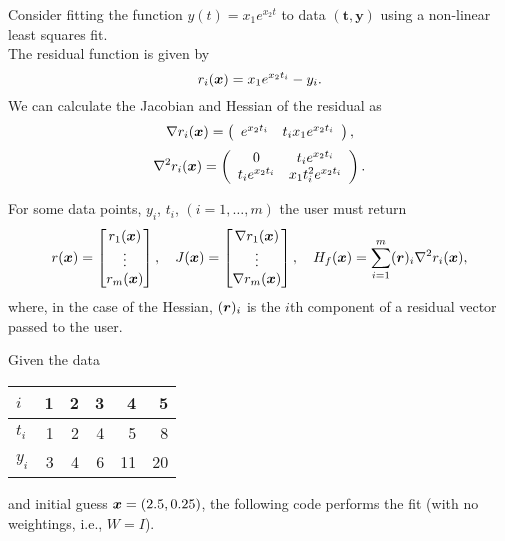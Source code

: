 
Consider fitting the function $y(t) = x_1e^{x_2 t}$ to data $(\bm{t}, \bm{y})$
using a non-linear least squares fit.\\
The residual function is given by
$$
   r_i({\bm x})  = x_1 e^{x_2 t_i} - y_i.
$$
We can calculate the Jacobian and Hessian of the residual as
$$
   \nabla r_i({\bm x}) = \left(\begin{array}{cc}
      e^{x_2 t_i} &
      t_i x_1 e^{x_2 t_i}
      \end{array}\right),
$$
$$
   \nabla^2 r_i({\bm x}) = \left(\begin{array}{cc}
      0                 & t_i e^{x_2 t_i}    \\
      t_i e^{x_2 t_i}     & x_1 t_i^2 e^{x_2 t_i}
   \end{array}\right).
$$

For some data points, $y_i$, $t_i$, $(i = 1,\dots,m)$ the user must return
$$  r({\bm x}) = \begin{bmatrix}
      r_1({\bm x})\\
      \vdots \\
      r_m({\bm x})
    \end{bmatrix}, \quad   J({\bm x}) = 
    \begin{bmatrix}
      \nabla r_1({\bm x}) \\
      \vdots \\
      \nabla r_m({\bm x}) \\
    \end{bmatrix}, \quad 
    H_f({\bm x}) = 
    \sum_{i=1}^m
    ({\bm r})_i \nabla^2 r_i({\bm x}),
$$
where, in the case of the Hessian, $({\bm r})_i$ is the $i$th component of a residual vector passed to the user.

Given the data
\begin{center}
   \begin{tabular}{l|*{5}{r}}
      $i$   & 1 & 2 & 3  & 4  & 5 \\
      \hline
      $t_i$ & 1 & 2 & 4  & 5  & 8 \\
      $y_i$ & 3 & 4 & 6 & 11 & 20
   \end{tabular}
\end{center}
and initial guess ${\bm x} = (2.5, 0.25)$, the following code performs the fit (with no 
weightings, i.e., $W = I$).

